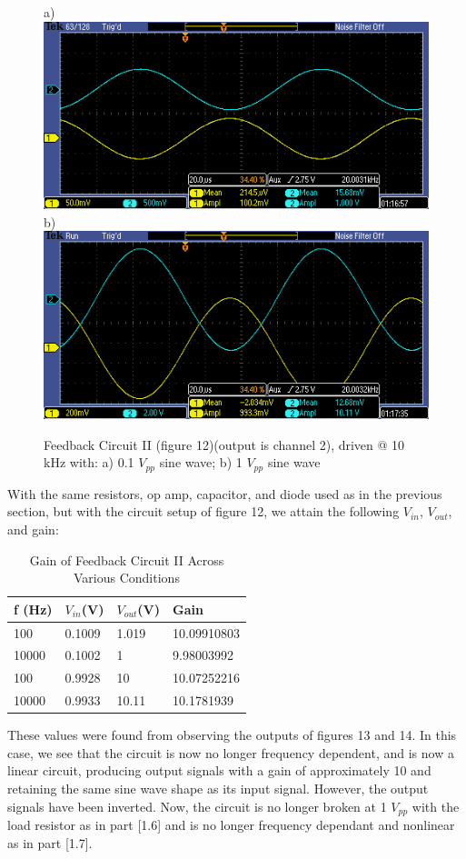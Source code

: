 \documentclass{article}
\begin{document}
    \begin{figure}[H]
        \centering
        a)\includegraphics[scale = 0.7]{8c.PNG}
        b)\includegraphics[scale = 0.7]{8d.PNG}
        \caption{Feedback Circuit II (figure 12)(output is channel 2), driven @ 10 kHz with: a) 0.1 $V_{pp}$ sine wave; b) 1 $V_{pp}$ sine wave}
        \label{fig:my_label}
    \end{figure}
    With the same resistors, op amp, capacitor, and diode used as in the previous section, but with the circuit setup of figure 12, we attain the following $V_{in}$, $V_{out}$, and gain:
    \begin{table}[H]
        \centering
        \caption{Gain of Feedback Circuit II Across Various Conditions}
        \label{my-label}
        \begin{tabular}{llll}
        \textbf{f (Hz)} & \textbf{$V_{in}$(V)} & \textbf{$V_{out}$(V)} & \textbf{Gain} \\ \hline
        100 & 0.1009 & 1.019 & 10.09910803 \\
        10000 & 0.1002 & 1 & 9.98003992 \\
        100 & 0.9928 & 10 & 10.07252216 \\
        10000 & 0.9933 & 10.11 & 10.1781939
        \end{tabular}
    \end{table}
    These values were found from observing the outputs of figures 13 and 14. In this case, we see that the circuit is now no longer frequency dependent, and is now a linear circuit, producing output signals with a gain of approximately 10 and retaining the same sine wave shape as its input signal. However, the output signals have been inverted. Now, the circuit is no longer broken at 1 $V_{pp}$ with the load resistor as in part [1.6] and is no longer frequency dependant and nonlinear as in part [1.7].
    
\end{document}

